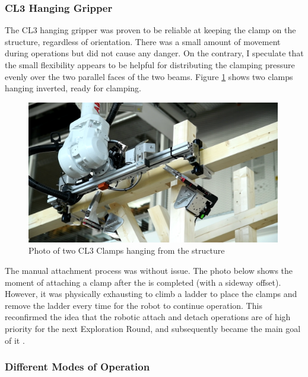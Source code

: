 \subsubsection{CL3 Hanging Gripper}
\label{subsubsection:exploration-2-cl3-hanging-gripper}

The CL3 hanging gripper was proven to be reliable at keeping the clamp on the structure, regardless of orientation. There was a small amount of movement during operations but did not cause any danger. On the contrary, I speculate that the small flexibility appears to be helpful for distributing the clamping pressure evenly over the two parallel faces of the two beams. Figure \ref{fig:cl3-clamp-hanging-photo} shows two clamps hanging inverted, ready for clamping.

\begin{figure}[h]
    \centering
    \includegraphics[width=0.99\textwidth]{images/05/image10.png}
    \caption{Photo of two CL3 Clamps hanging from the structure}
    \label{fig:cl3-clamp-hanging-photo}
\end{figure}

The manual attachment process was without issue. The photo below shows the moment of attaching a clamp after the  is completed (with a sideway offset). However, it was physically exhausting to climb a ladder to place the clamps and remove the ladder every time for the robot to continue operation. This reconfirmed the idea that the robotic attach and detach operations are of high priority for the next Exploration Round, and subsequently became the main goal of it .

\subsubsection{Different Modes of Operation}
\label{subsubsection:exploration-2-different-modes-of-operation}


